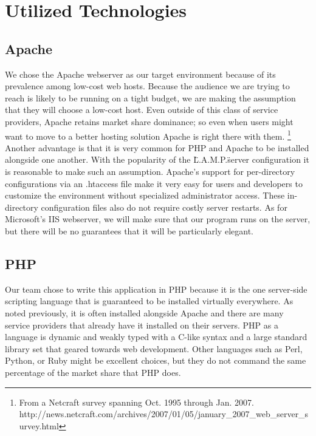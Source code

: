 \documentclass[a4paper,12pt]{report}
\begin{document}
\chapter{Utilized Technologies}
\section{Apache}
We chose the Apache webserver as our target environment because of its prevalence among low-cost web hosts.
Because the audience we are trying to reach is likely to be running on a tight budget, we are making the assumption that they will choose a low-cost host.
Even outside of this class of service providers, Apache retains market share dominance; so even when users might want to move to a better hosting solution Apache is right there with them. \footnote{From a Netcraft survey spanning Oct. 1995 through Jan. 2007. http://news.netcraft.com/archives/2007/01/05/january\_2007\_web\_server\_survey.html}
Another advantage is that it is very common for PHP and Apache to be installed alongside one another.
With the popularity of the \"L.A.M.P.\" server configuration it is reasonable to make such an assumption.
Apache's support for per-directory configurations via an .htaccess file make it very easy for users and developers to customize the environment without specialized administrator access.
These in-directory configuration files also do not require costly server restarts.
As for Microsoft's IIS webserver, we will make sure that our program runs on the server, but there will be no guarantees that it will be particularly elegant.


\section{PHP}
Our team chose to write this application in PHP because it is the one server-side scripting language that is guaranteed to be installed virtually everywhere.
As noted previously, it is often installed alongside Apache and there are many service providers that already have it installed on their servers.
PHP as a language is dynamic and weakly typed with a C-like syntax and a large standard library set that geared towards web development.
Other languages such as Perl, Python, or Ruby might be excellent choices, but they do not command the same percentage of the market share that PHP does.
\end{document}
